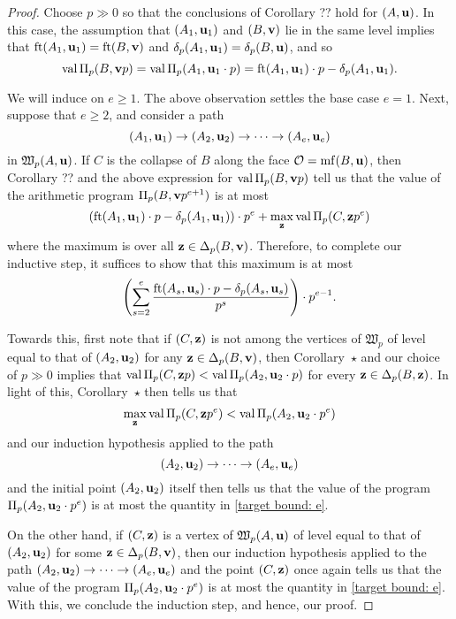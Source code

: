 \documentclass[11pt]{amsart}
\renewcommand{\!}[1]{{\color{red}\text{$\star$\,}#1\,$\star$}}
\begin{document}
\begin{proof}  Choose $p \gg 0$ so that the conclusions of Corollary ?? hold for $(A, \mathbf{u})$.  In this case, the assumption that $(A_1, \mathbf{u}_1)$ and $(B, \mathbf{v})$ lie in the same level implies that $\operatorname{ft}(A_1, \mathbf{u}_1) = \operatorname{ft}(B, \mathbf{v})$ and $\delta_p(A_1, \mathbf{u}_1) = \delta_p(B, \mathbf{u})$, and so 
\[ \operatorname{val} \Pi_p(B, \mathbf{v}p) = \operatorname{val} \Pi_p (A_1, \mathbf{u}_1 \cdot p) = \operatorname{ft}(A_1, \mathbf{u}_1) \cdot p - \delta_p(A_1, \mathbf{u}_1). \] 

We will induce on $e \geq 1$.  The above observation settles the base case $e=1$.  Next, suppose that $e \geq 2$, and consider a path  \[ (A_1, \mathbf{u}_1) \to (A_2, \mathbf{u}_2) \to \cdots \to (A_e, \mathbf{u}_e)\] in $\mathfrak{W}_p(A, \mathbf{u})$.  If $C$ is the collapse of $B$ along the face $\mathcal{O} = \operatorname{mf}(B, \mathbf{u})$, then Corollary ??  and the above expression for $\operatorname{val} \Pi_p(B, \mathbf{v}p)$ tell us that the value of the arithmetic program $\Pi_p(B, \mathbf{v}p^{e+1})$ is at most
%
\[  \left( \operatorname{ft}(A_1, \mathbf{u}_1) \cdot p - \delta_p(A_1, \mathbf{u}_1) \right) \cdot p^e +  \max_{\mathbf{z}} \operatorname{val} \Pi_p(C, \mathbf{z}p^e) \]
%
where the maximum is over all $\mathbf{z} \in \Delta_p(B, \mathbf{v})$.   Therefore, to complete our inductive step, it suffices to show that this maximum is at most
%
\begin{equation}
\label{target bound: e}
\left( \sum_{s=2}^e \frac{ \operatorname{ft}(A_s, \mathbf{u}_s)  \cdot p - \delta_p(A_s, \mathbf{u}_s)}{p^s} \right) \cdot p^{e-1}.  \end{equation}



Towards this, first note that if $(C, \mathbf{z})$ is not among the vertices of $\mathfrak{W}_p$ of level equal to that of $(A_2, \mathbf{u}_2)$ for any $\mathbf{z} \in \Delta_p(B, \mathbf{v})$, then Corollary \!{} and our choice of $p \gg 0$ implies that $\operatorname{val} \Pi_p(C, \mathbf{z}p) < \operatorname{val} \Pi_p(A_2, \mathbf{u}_2 \cdot p)$ for every $\mathbf{z} \in \Delta_p(B, \mathbf{z})$.  In light of this, Corollary \!{} then tells us that 
\[  \max_{\mathbf{z}} \operatorname{val} \Pi_p(C, \mathbf{z}p^e) < \operatorname{val} \Pi_p(A_2, \mathbf{u}_2 \cdot p^e)\]  
and our induction hypothesis applied to the path 
\[ (A_2, \mathbf{u}_2) \to \cdots \to (A_e, \mathbf{u}_e) \] and the initial point $(A_2, \mathbf{u}_2)$ itself then tells us that the value of the program $\Pi_p(A_2, \mathbf{u}_2 \cdot p^e)$ is at most the quantity in \eqref{target bound: e}.  

On the other hand, if $(C, \mathbf{z})$ is a vertex of $\mathfrak{W}_p(A, \mathbf{u})$ of level equal to that of $(A_2, \mathbf{u}_2)$ for some $\mathbf{z} \in \Delta_p(B, \mathbf{v})$, then our induction hypothesis applied to the path 
$(A_2, \mathbf{u}_2) \to \cdots \to (A_e, \mathbf{u}_e)$ and the point $(C, \mathbf{z})$ once again tells us that the value of the program $\Pi_p(A_2, \mathbf{u}_2 \cdot p^e)$ is at most the quantity in \eqref{target bound: e}.  With this, we conclude the induction step, and hence, our proof. 
\end{proof}
\end{document}
